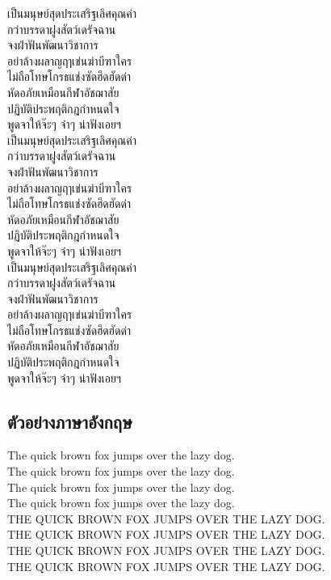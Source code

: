 \documentclass[twocolumn,a4paper]{article}
\begin{document}
เป็นมนุษย์สุดประเสริฐเลิศคุณค่า\\
กว่าบรรดาฝูงสัตว์เดรัจฉาน \\
จงฝ่าฟันพัฒนาวิชาการ \\
อย่าล้างผลาญฤๅเข่นฆ่าบีฑาใคร\\ 
ไม่ถือโทษโกรธแช่งซัดฮึดฮัดด่า \\
หัดอภัยเหมือนกีฬาอัชฌาสัย \\
ปฏิบัติประพฤติกฎกำหนดใจ \\
พูดจาให้จ๊ะๆ จ๋าๆ น่าฟังเอยฯ\\ 

เป็นมนุษย์สุดประเสริฐเลิศคุณค่า\\
กว่าบรรดาฝูงสัตว์เดรัจฉาน \\
จงฝ่าฟันพัฒนาวิชาการ \\
อย่าล้างผลาญฤๅเข่นฆ่าบีฑาใคร\\ 
ไม่ถือโทษโกรธแช่งซัดฮึดฮัดด่า \\
หัดอภัยเหมือนกีฬาอัชฌาสัย \\
ปฏิบัติประพฤติกฎกำหนดใจ \\
พูดจาให้จ๊ะๆ จ๋าๆ น่าฟังเอยฯ\\ 

เป็นมนุษย์สุดประเสริฐเลิศคุณค่า\\
กว่าบรรดาฝูงสัตว์เดรัจฉาน \\
จงฝ่าฟันพัฒนาวิชาการ \\
อย่าล้างผลาญฤๅเข่นฆ่าบีฑาใคร\\ 
ไม่ถือโทษโกรธแช่งซัดฮึดฮัดด่า \\
หัดอภัยเหมือนกีฬาอัชฌาสัย \\
ปฏิบัติประพฤติกฎกำหนดใจ \\
พูดจาให้จ๊ะๆ จ๋าๆ น่าฟังเอยฯ\\ 

\subsection{ตัวอย่างภาษาอังกฤษ}
The quick brown fox jumps over the lazy dog.\\
The quick brown fox jumps over the lazy dog.\\
The quick brown fox jumps over the lazy dog.\\
The quick brown fox jumps over the lazy dog.\\
\MakeUppercase{The quick brown fox jumps over the lazy dog.}\\
\MakeUppercase{The quick brown fox jumps over the lazy dog.}\\
\MakeUppercase{The quick brown fox jumps over the lazy dog.}\\
\MakeUppercase{The quick brown fox jumps over the lazy dog.}\\
\end{document}
